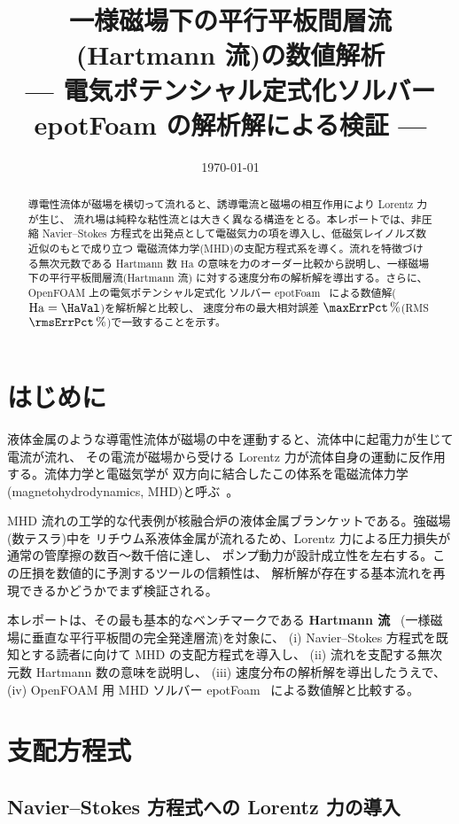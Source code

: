 \documentclass{ltjsarticle}   %
\title{一様磁場下の平行平板間層流(Hartmann 流)の数値解析\\
  --- 電気ポテンシャル定式化ソルバー epotFoam の解析解による検証 ---}
\author{}
\date{\today}
\newcommand{\Ha}{\mathrm{Ha}}
\begin{document}
\maketitle

\begin{abstract}
導電性流体が磁場を横切って流れると、誘導電流と磁場の相互作用により Lorentz 力が生じ、
流れ場は純粋な粘性流とは大きく異なる構造をとる。本レポートでは、非圧縮 Navier--Stokes
方程式を出発点として電磁気力の項を導入し、低磁気レイノルズ数近似のもとで成り立つ
電磁流体力学(MHD)の支配方程式系を導く。流れを特徴づける無次元数である Hartmann 数
$\Ha$ の意味を力のオーダー比較から説明し、一様磁場下の平行平板間層流(Hartmann 流)
に対する速度分布の解析解を導出する。さらに、OpenFOAM 上の電気ポテンシャル定式化
ソルバー epotFoam~\cite{tassone2016} による数値解($\Ha=\HaVal$)を解析解と比較し、
速度分布の最大相対誤差 $\maxErrPct\,\%$(RMS $\rmsErrPct\,\%$)で一致することを示す。
\end{abstract}

\section{はじめに}

液体金属のような導電性流体が磁場の中を運動すると、流体中に起電力が生じて電流が流れ、
その電流が磁場から受ける Lorentz 力が流体自身の運動に反作用する。流体力学と電磁気学が
双方向に結合したこの体系を電磁流体力学(magnetohydrodynamics, MHD)と呼ぶ~\cite{moreau1990}。

MHD 流れの工学的な代表例が核融合炉の液体金属ブランケットである。強磁場(数テスラ)中を
リチウム系液体金属が流れるため、Lorentz 力による圧力損失が通常の管摩擦の数百〜数千倍に達し、
ポンプ動力が設計成立性を左右する。この圧損を数値的に予測するツールの信頼性は、
解析解が存在する基本流れを再現できるかどうかでまず検証される。

本レポートは、その最も基本的なベンチマークである \textbf{Hartmann 流}~\cite{hartmann1937}
(一様磁場に垂直な平行平板間の完全発達層流)を対象に、
(i) Navier--Stokes 方程式を既知とする読者に向けて MHD の支配方程式を導入し、
(ii) 流れを支配する無次元数 Hartmann 数の意味を説明し、
(iii) 速度分布の解析解を導出したうえで、
(iv) OpenFOAM 用 MHD ソルバー epotFoam~\cite{tassone2016} による数値解と比較する。

\section{支配方程式}

\subsection{Navier--Stokes 方程式への Lorentz 力の導入}
\end{document}
